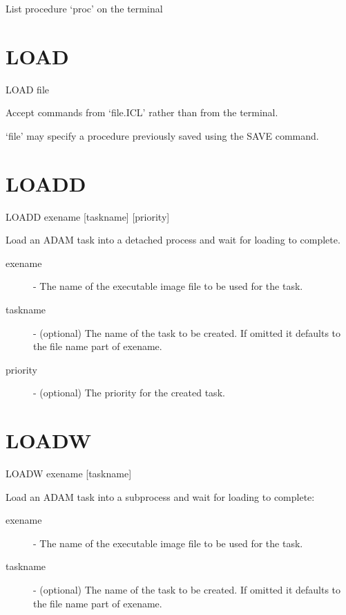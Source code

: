 \documentclass[twoside,11pt,nolof,chapters]{starlink}
\begin{document}
 List procedure `proc' on the terminal

\section{LOAD\label{LOAD}}

    LOAD  file

 Accept commands from `file.ICL' rather than from the terminal.

 `file' may specify a procedure previously saved using the SAVE command.

\section{LOADD\label{LOADD}}


    LOADD \hspace{.5cm} exename \hspace{.5cm} [taskname] \hspace{.5cm} [priority]

    Load an ADAM task into a detached process and wait for
    loading to complete.
\begin{description}

\item[exename] - The name of the executable image file to
            be used for the task.

\item[taskname] - (optional) The name of the task to be created.
            If omitted it defaults to the file name part of
            exename.

\item[priority] - (optional) The priority for the created task.

\end{description}

\section{LOADW\label{LOADW}}


    LOADW \hspace{.5cm} exename \hspace{.5cm} [taskname]

    Load an ADAM task into a subprocess and wait for loading to complete:
\begin{description}

\item[exename] - The name of the executable image file to
            be used for the task.

\item[taskname] - (optional) The name of the task to be created.
            If omitted it defaults to the file name part of
            exename.

\end{description}
\end{document}
